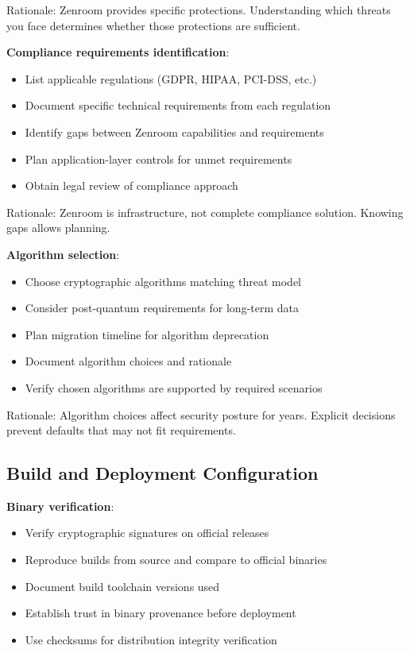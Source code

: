 Rationale: Zenroom provides specific protections. Understanding which
threats you face determines whether those protections are sufficient.

\textbf{Compliance requirements identification}:

\begin{itemize}
\item List applicable regulations (GDPR, HIPAA, PCI-DSS, etc.)
\item Document specific technical requirements from each regulation
\item Identify gaps between Zenroom capabilities and requirements
\item Plan application-layer controls for unmet requirements
\item Obtain legal review of compliance approach
\end{itemize}

Rationale: Zenroom is infrastructure, not complete compliance
solution. Knowing gaps allows planning.

\textbf{Algorithm selection}:

\begin{itemize}
\item Choose cryptographic algorithms matching threat model
\item Consider post-quantum requirements for long-term data
\item Plan migration timeline for algorithm deprecation
\item Document algorithm choices and rationale
\item Verify chosen algorithms are supported by required scenarios
\end{itemize}

Rationale: Algorithm choices affect security posture for
years. Explicit decisions prevent defaults that may not fit
requirements.

\subsection{Build and Deployment Configuration}

\textbf{Binary verification}:

\begin{itemize}
\item Verify cryptographic signatures on official releases
\item Reproduce builds from source and compare to official binaries
\item Document build toolchain versions used
\item Establish trust in binary provenance before deployment
\item Use checksums for distribution integrity verification
\end{itemize}

